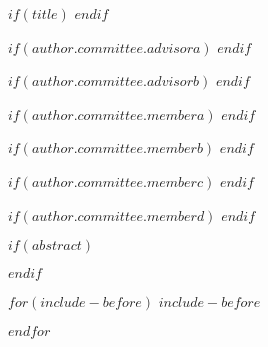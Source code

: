 \documentclass[$if(fontsize)$$fontsize$,$endif$$if(lang)$$babel-lang$,$endif$$if(papersize)$$papersize$paper,$endif$$for(classoption)$$classoption$$sep$,$endfor$]{$documentclass$}
\author{$author.first$ $author.last$}
\begin{document}
$if(title)$
$endif$


$if(author.committee.advisora)$
$endif$

$if(author.committee.advisorb)$
$endif$

$if(author.committee.membera)$
$endif$

$if(author.committee.memberb)$
$endif$

$if(author.committee.memberc)$
$endif$

$if(author.committee.memberd)$
$endif$

\thesismaketitle 
\thesismakecopyright


\addtolength{\headsep}{-0.1875in} %
\doublespace

$if(abstract)$
\begin{abstract}
\vspace{1pc}
$abstract$
\end{abstract}
$endif$

$for(include-before)$
$include-before$

$endfor$
\end{document}
